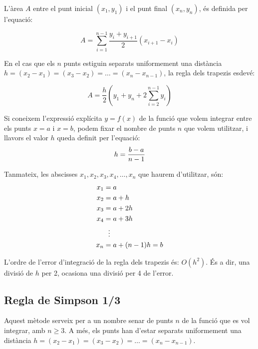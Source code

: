 L'àrea $A$ entre el punt inicial $(x_1, y_1)$ i el punt final $(x_n, y_n)$, és definida per l'equació:

 \begin{equation}\label{eq:trap-uneven}
    A = \sum_{i=1}^{n-1} \frac{y_i + y_{i+1}}{2} (x_{i+1}-x_i)
 \end{equation}

En el cas que els $n$ punts estiguin separats uniformement una distància $h = (x_2-x_1) = (x_3-x_2) = \dots = (x_n-x_{n-1})$, la regla dels trapezis esdevé:

 \begin{equation}\label{eq:trap}
    A = \frac{h}{2} \left( y_1 + y_n + 2 \sum_{i=2}^{n-1} y_i \right)
 \end{equation}

Si coneixem l'expressió explícita $y=f(x)$ de la funció que volem integrar entre els punts $x=a$ i $x=b$, podem fixar el nombre de punts $n$ que volem utilitzar, i llavors el valor $h$ queda definit per l'equació:
\begin{equation}\label{eq:trap_1}
    h = \frac{b-a}{n-1}\\
\end{equation}

Tanmateix, les abscisses $x_1, x_2, x_3,x_4, \dotsc , x_n$ que haurem d'utilitzar, són:
\begin{align}\label{eq:trap_2}
    x_1 &= a \notag\\
    x_2 &= a + h \notag\\
    x_3 &= a + 2 h \notag\\
    x_4 &= a + 3 h\\
    {} &\hspace{1.5ex}\vdots {} \notag\\
    x_n &= a + (n-1)h =b \notag
\end{align}

L'ordre de l'error d'integració de la regla dels trapezis és: $O(h^2)$. És a dir, una divisió de $h$ per 2, ocasiona una divisió per 4 de l'error.

\subsection{Regla de Simpson 1/3}

Aquest mètode serveix per a un nombre senar de punts $n$ de la funció que es vol integrar, amb $n \geq 3$. A més, els punts han d'estar separats uniformement una distància $h = (x_2-x_1) = (x_3-x_2) = \dots = (x_n-x_{n-1})$.

